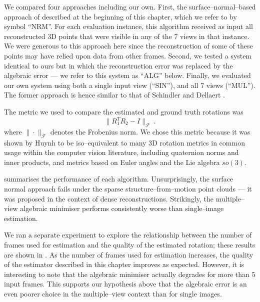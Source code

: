 We compared four approaches including our own. First, the
surface--normal--based approach of \cite{Furukawa09} described at the
beginning of this chapter, which we refer to by symbol ``NRM''. For
each evaluation instance, this algorithm received as input all
reconstructed 3D points that were visible in any of the 7 views in
that instance. We were generous to this approach here since the
reconstruction of some of these points may have relied upon data from
other frames. Second, we tested a system identical
to ours but in which the reconstruction error was replaced by the
algebraic error --- we refer to this system as ``ALG'' below. Finally, we
evaluated our own system using both a single input view (``SIN''), and
all 7 views (``MUL''). The former approach is hence similar to that of
Schindler and Dellaert \cite{Schindler2004}.

The metric we used to compare the estimated and ground truth
rotations was
\begin{equation}
  \| R_1^T R_2 - I \|_{\mathcal{F}} ~.
  \label{eq:rotation-metric}
\end{equation}
where $\|\cdot\|_{\mathcal{F}}$ denotes the Frobenius norm. We chose
this metric because it was shown by Huynh \cite{Huynh2009} to be
iso--equivalent to many 3D rotation metrics in common usage within
the computer vision literature, including quaternion norms and inner
products, and metrics based on Euler angles and the Lie algebra
$so(3)$.

 summarises the performance of each
algorithm. Unsurprisingly, the surface normal approach fails under the
sparse structure--from--motion point clouds --- it was proposed in the
context of dense reconstructions. Strikingly, the multiple--view
algebraic minimiser performs consistently worse than single--image
estimation. 

We ran a separate experiment to explore the relationship between the
number of frames used for estimation and the quality of the estimated
rotation; these results are shown in . As the
number of frames used for estimation increases, the quality of the
estimator described in this chapter improves as expected. However, it
is interesting to note that the algebraic minimiser actually degrades
for more than 5 input frames. This supports our hypothesis above that
the algebraic error is an even poorer choice in the multiple--view
context than for single images.

